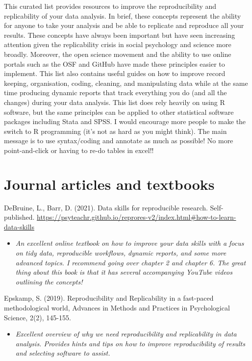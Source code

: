 \documentclass[
]{book}
\providecommand{\tightlist}{%
  \setlength{\itemsep}{0pt}\setlength{\parskip}{0pt}}
\begin{document}
This curated list provides resources to improve the reproducibility and replicability of your data analysis. In brief, these concepts represent the ability for anyone to take your analysis and be able to replicate and reproduce all your results. These concepts have always been important but have seen increasing attention given the replicability crisis in social psychology and science more broadly. Moreover, the open science movement and the ability to use online portals such as the OSF and GitHub have made these principles easier to implement. This list also contains useful guides on how to improve record keeping, organisation, coding, cleaning, and manipulating data while at the same time producing dynamic reports that track everything you do (and all the changes) during your data analysis. This list does rely heavily on using R software, but the same principles can be applied to other statistical software packages including Stata and SPSS. I would encourage more people to make the switch to R programming (it's not as hard as you might think). The main message is to use syntax/coding and annotate as much as possible! No more point-and-click or having to re-do tables in excel!!

\hypertarget{journal-articles-and-textbooks}{%
\section{Journal articles and textbooks}\label{journal-articles-and-textbooks}}

DeBruine, L., Barr, D. (2021). Data skills for reproducible research. Self-published. \url{https://psyteachr.github.io/reprores-v2/index.html\#how-to-learn-data-skills}

\begin{itemize}
\tightlist
\item
  \emph{An excellent online textbook on how to improve your data skills with a focus on tidy data, reproducible workflows, dynamic reports, and some more advanced topics. I recommend going over chapter 2 and chapter 6. The great thing about this book is that it has several accompanying YouTube videos outlining the concepts!}
\end{itemize}

Epskamp, S. (2019). Reproducibility and Replicability in a fast-paced methodological world, Advances in Methods and Practices in Psychological Science, 2(2), 145-155.

\begin{itemize}
\tightlist
\item
  \emph{Excellent overview of why we need reproducibility and replicability in data analysis. Provides hints and tips on how to improve reproducibility of results and selecting software to assist.}
\end{itemize}
\end{document}
